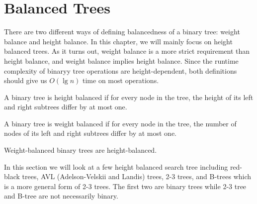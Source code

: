 \section{Balanced Trees}

There are two different ways of defining balancedness of a binary tree: weight balance and height balance. In this chapter, we will mainly focus on height balanced trees. As it turns out, weight balance is a more strict requirement than height balance, and weight balance implies height balance. Since the runtime complexity of binaryy tree operations are height-dependent, both definitions should give us $O(\lg n)$ time on most operations.

\begin{definition} 
    A binary tree is height balanced if for every node in the tree, the height of its left and right subtrees differ by at most one.
\end{definition}

\begin{definition} 
    A binary tree is weight balanced if for every node in the tree, the number of nodes of its left and right subtrees differ by at most one.
\end{definition}

\begin{corollary}
    Weight-balanced binary trees are height-balanced.
\end{corollary}

In this section we will look at a few height balanced search tree including red-black trees, AVL (Adelson-Velskii and Landis) trees, 2-3 trees, and B-trees which is a more general form of 2-3 trees. The first two are binary trees while 2-3 tree and B-tree are not necessarily binary.